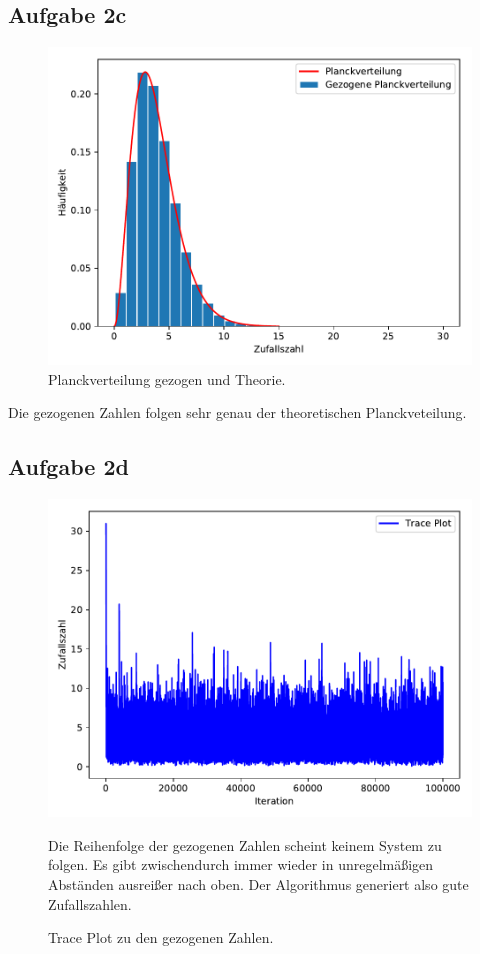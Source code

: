     \subsection{Aufgabe 2c}

    \begin{figure}[H]
      \centering
      \includegraphics[width=\textwidth]{plot1.pdf}
      \caption{Planckverteilung gezogen und Theorie.}
      \label{fig:1}
    \end{figure}
    Die gezogenen Zahlen folgen sehr genau der theoretischen Planckveteilung.

    \subsection{Aufgabe 2d}

    \begin{figure}[H]
      \centering
      \includegraphics[width=\textwidth]{plot2.pdf}
      \caption{Trace Plot zu den gezogenen Zahlen.}
      \label{fig:2}
      Die Reihenfolge der gezogenen Zahlen scheint keinem System zu folgen. Es gibt zwischendurch
      immer wieder in unregelmäßigen Abständen ausreißer nach oben.
      Der Algorithmus generiert also gute Zufallszahlen.
    \end{figure}



